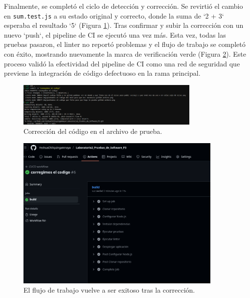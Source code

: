 \documentclass[12pt, a4paper]{article}
\begin{document}
Finalmente, se complet\'o el ciclo de detecci\'on y correcci\'on. Se revirti\'o el cambio en \texttt{sum.test.js} a su estado original y correcto, donde la suma de `2 + 3` esperaba el resultado `5` (Figura \ref{fig:codigo_corregido}). Tras confirmar y subir la correcci\'on con un nuevo `push`, el pipeline de CI se ejecut\'o una vez m\'as. Esta vez, todas las pruebas pasaron, el linter no report\'o problemas y el flujo de trabajo se complet\'o con \'exito, mostrando nuevamente la marca de verificaci\'on verde (Figura \ref{fig:workflow_verde_final}). Este proceso valid\'o la efectividad del pipeline de CI como una red de seguridad que previene la integraci\'on de c\'odigo defectuoso en la rama principal.

\begin{figure}[H]
    \centering
    \includegraphics[width=0.8\textwidth]{img/corregimos el codigo para que nos reconozca github actions con el codigo bien hecho.png}
    \caption{Correcci\'on del c\'odigo en el archivo de prueba.}
    \label{fig:codigo_corregido}
\end{figure}

\begin{figure}[H]
    \centering
    \includegraphics[width=0.9\textwidth]{img/en github acitons vemos que esta todo correcto y nos salto en verde.png}
    \caption{El flujo de trabajo vuelve a ser exitoso tras la correcci\'on.}
    \label{fig:workflow_verde_final}
\end{figure}
\end{document}
